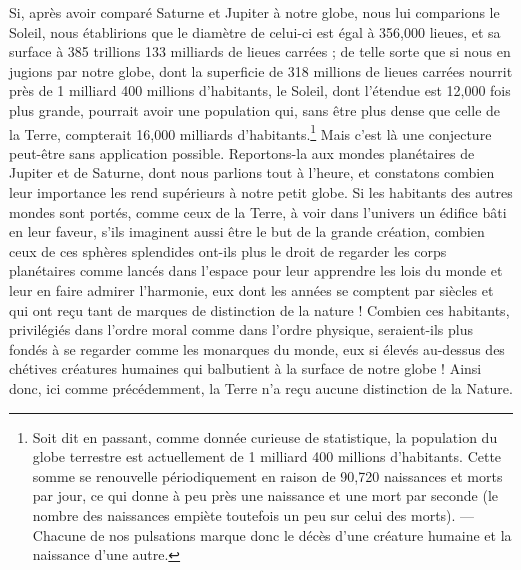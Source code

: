 \documentclass[a4paper, 11pt, oneside]{article}
\begin{document}
Si, après avoir comparé Saturne et Jupiter à notre globe, nous lui comparions le Soleil, nous établirions que le diamètre de celui-ci est égal à 356,000 lieues, et sa surface à 385 trillions 133 milliards de lieues carrées ; de telle sorte que si nous en jugions par notre globe, dont la superficie de 318 millions de lieues carrées nourrit près de 1 milliard 400 millions d'habitants, le Soleil, dont l'étendue est 12,000 fois plus grande, pourrait avoir une population qui, sans être plus dense que celle de la Terre, compterait 16,000 milliards d'habitants.\footnote{Soit dit en passant, comme donnée curieuse de statistique, la population du globe terrestre est actuellement de 1 milliard 400 millions d'habitants. Cette somme se renouvelle périodiquement en raison de 90,720 naissances et morts par jour, ce qui donne à peu près une naissance et une mort par seconde (le nombre des naissances empiète toutefois un peu sur celui des morts). --- Chacune de nos pulsations marque donc le décès d'une créature humaine et la naissance d'une autre.} Mais c'est là une conjecture peut-être sans application possible. Reportons-la aux mondes planétaires de Jupiter et de Saturne, dont nous parlions tout à l'heure, et constatons combien leur importance les rend supérieurs à notre petit globe. Si les habitants des autres mondes sont portés, comme ceux de la Terre, à voir dans l'univers un édifice bâti en leur faveur, s'ils imaginent aussi être le but de la grande création, combien ceux de ces sphères splendides ont-ils plus le droit de regarder les corps planétaires comme lancés dans l'espace pour leur apprendre les lois du monde et leur en faire admirer l'harmonie, eux dont les années se comptent par siècles et qui ont reçu tant de marques de distinction de la nature ! Combien ces habitants, privilégiés dans l'ordre moral comme dans l'ordre physique, seraient-ils plus fondés à se regarder comme les monarques du monde, eux si élevés au-dessus des chétives créatures humaines qui balbutient à la surface de notre globe ! Ainsi donc, ici comme précédemment, la Terre n'a reçu aucune distinction de la Nature.
\end{document}
